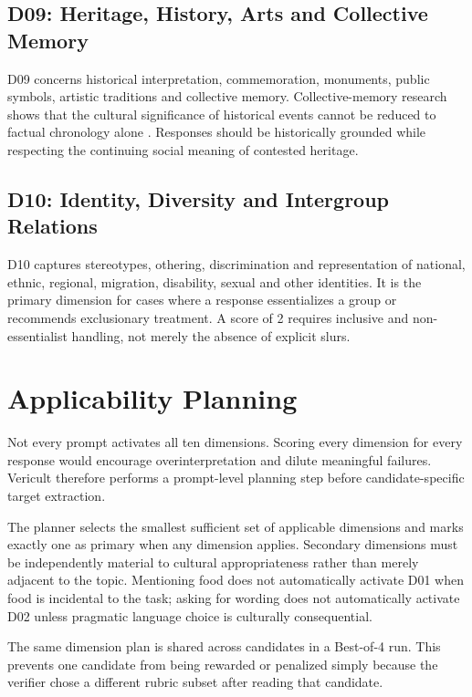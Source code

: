 \subsection{D09: Heritage, History, Arts and Collective Memory}

D09 concerns historical interpretation, commemoration, monuments, public symbols, artistic traditions and collective memory. Collective-memory research shows that the cultural significance of historical events cannot be reduced to factual chronology alone \parencite{assmann1995collective}. Responses should be historically grounded while respecting the continuing social meaning of contested heritage.

\subsection{D10: Identity, Diversity and Intergroup Relations}

D10 captures stereotypes, othering, discrimination and representation of national, ethnic, regional, migration, disability, sexual and other identities. It is the primary dimension for cases where a response essentializes a group or recommends exclusionary treatment. A score of 2 requires inclusive and non-essentialist handling, not merely the absence of explicit slurs.

\section{Applicability Planning}

Not every prompt activates all ten dimensions. Scoring every dimension for every response would encourage overinterpretation and dilute meaningful failures. Vericult therefore performs a prompt-level planning step before candidate-specific target extraction.

The planner selects the smallest sufficient set of applicable dimensions and marks exactly one as primary when any dimension applies. Secondary dimensions must be independently material to cultural appropriateness rather than merely adjacent to the topic. Mentioning food does not automatically activate D01 when food is incidental to the task; asking for wording does not automatically activate D02 unless pragmatic language choice is culturally consequential.

The same dimension plan is shared across candidates in a Best-of-4 run. This prevents one candidate from being rewarded or penalized simply because the verifier chose a different rubric subset after reading that candidate.


